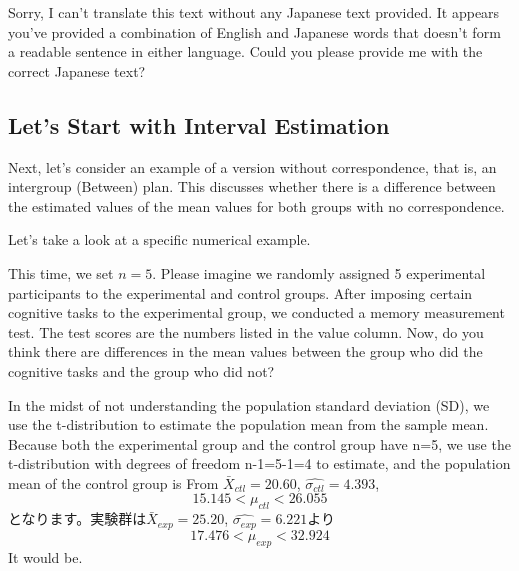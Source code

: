 \documentclass{ltjsbook}
\begin{document}
Sorry, I can't translate this text without any Japanese text provided. It appears you've provided a combination of English and Japanese words that doesn't form a readable sentence in either language. Could you please provide me with the correct Japanese text?
\subsection{Let's Start with Interval Estimation}
Next, let's consider an example of a version without correspondence, that is, an intergroup (Between) plan. This discusses whether there is a difference between the estimated values of the mean values for both groups with no correspondence.



Let's take a look at a specific numerical example.

This time, we set $n=5$. Please imagine we randomly assigned 5 experimental participants to the experimental and control groups. After imposing certain cognitive tasks to the experimental group, we conducted a memory measurement test. The test scores are the numbers listed in the value column. Now, do you think there are differences in the mean values between the group who did the cognitive tasks and the group who did not?

In the midst of not understanding the population standard deviation (SD), we use the t-distribution to estimate the population mean from the sample mean. Because both the experimental group and the control group have n=5, we use the t-distribution with degrees of freedom n-1=5-1=4 to estimate, and the population mean of the control group is
From $\bar{X}_{ctl} =20.60$, $\hat{\sigma_{ctl}}=4.393$,
\[15.145 < \mu_{ctl}<26.055 \]
となります。実験群は$\bar{X}_{exp} = 25.20$,
$\hat{\sigma_{exp}}=6.221$より
\[17.476<\mu_{exp}< 32.924 \]
It would be.
\end{document}
